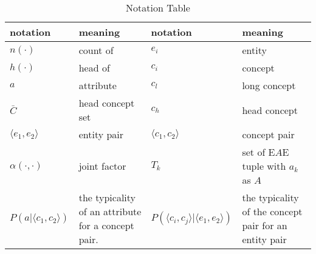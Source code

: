 \begin{table}[htbp]
  \centering
     \small
  \caption{Notation Table}
    \footnotesize

    \begin{tabular}{|ll|ll|}
    \hline
    notation                            &  meaning                            & notation                            &  meaning  \\
    \hline
    $n(\cdot)$                          &  count of                            & $e_i$                               &  entity  \\
    $h(\cdot)$                          &  head of                             & $c_i$                               &  concept  \\
    $a$                                 &  attribute                          & $c_l$                               &  long concept  \\
    $\bar{C}$                           &  head concept set                  & $c_h$                               &  head concept  \\
    $\langle e_1,e_2\rangle$            &  entity pair                        & $\langle c_1,c_2\rangle$            &  concept pair \\
    $\alpha(\cdot,\cdot)$               &  joint factor                       & $T_k$                               & \parbox{0.26\columnwidth}{ set of E$A$E tuple with $a_k$ as $A$} \\
    \parbox{0.15\columnwidth}{\scriptsize $P(a|\langle c_{1},c_{2}\rangle)$ }  &  \parbox{0.24\columnwidth}{ the typicality of an attribute for a concept pair. }& \parbox{0.23\columnwidth}{\scriptsize $P(\langle  c_{i},c_{j}\rangle|\langle e_{1},e_{2}\rangle)$} & \parbox{0.26\columnwidth}{ the typicality of the concept pair for an entity pair} \\
    \hline
    
    \end{tabular}%

  \label{tab:notation}%
\end{table}%



